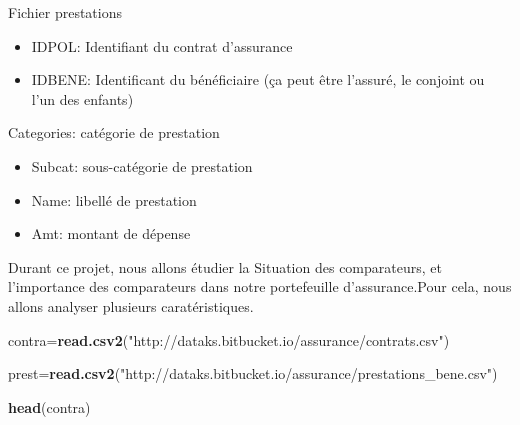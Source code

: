 \documentclass[
]{article}
\newenvironment{Shaded}{\begin{snugshade}}{\end{snugshade}}
\newcommand{\KeywordTok}[1]{\textcolor[rgb]{0.13,0.29,0.53}{\textbf{#1}}}
\newcommand{\NormalTok}[1]{#1}
\newcommand{\StringTok}[1]{\textcolor[rgb]{0.31,0.60,0.02}{#1}}
\begin{document}
Fichier prestations

\begin{itemize}
\item
  IDPOL: Identifiant du contrat d'assurance
\item
  IDBENE: Identificant du bénéficiaire (ça peut être l'assuré, le
  conjoint ou l'un des enfants)
\end{itemize}

Categories: catégorie de prestation

\begin{itemize}
\item
  Subcat: sous-catégorie de prestation
\item
  Name: libellé de prestation
\item
  Amt: montant de dépense
\end{itemize}

Durant ce projet, nous allons étudier la Situation des comparateurs, et
l'importance des comparateurs dans notre portefeuille d'assurance.Pour
cela, nous allons analyser plusieurs caratéristiques.

\begin{Shaded}
\begin{Highlighting}[]
\NormalTok{contra=}\KeywordTok{read.csv2}\NormalTok{(}\StringTok{"http://dataks.bitbucket.io/assurance/contrats.csv"}\NormalTok{)}

\NormalTok{prest=}\KeywordTok{read.csv2}\NormalTok{(}\StringTok{"http://dataks.bitbucket.io/assurance/prestations_bene.csv"}\NormalTok{)}
\end{Highlighting}
\end{Shaded}

\begin{Shaded}
\begin{Highlighting}[]
\KeywordTok{head}\NormalTok{(contra)}
\end{Highlighting}
\end{Shaded}
\end{document}
